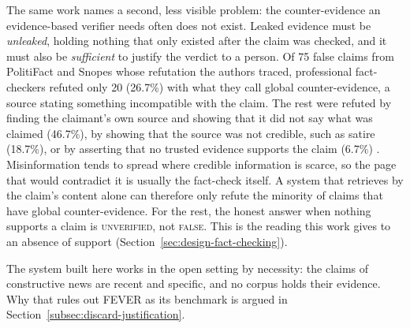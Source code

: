 The same work names a second, less visible problem: the counter-evidence
an evidence-based verifier needs often does not exist. Leaked evidence
must be \emph{unleaked}, holding nothing that only existed after the
claim was checked, and it must also be \emph{sufficient} to justify the
verdict to a person. Of 75 false claims from PolitiFact and Snopes whose
refutation the authors traced, professional fact-checkers refuted only
20 (26.7\%) with what they call global counter-evidence, a source stating
something incompatible with the claim. The rest were refuted by finding the
claimant's own source and showing that it did not say what was claimed
(46.7\%), by showing that the source was not credible, such as satire
(18.7\%), or by asserting that no trusted evidence supports the claim
(6.7\%) \cite{glockner2022missing}. Misinformation tends to spread where
credible information is scarce, so the page that would contradict it is
usually the fact-check itself. A system that retrieves by the claim's
content alone can therefore only refute the minority of claims that
have global counter-evidence. For the rest, the honest answer when
nothing supports a claim is \textsc{unverified}, not \textsc{false}.
This is the reading this work gives to an absence of support
(Section~\ref{sec:design-fact-checking}).

The system built here works in the open setting by necessity: the
claims of constructive news are recent and specific, and no corpus
holds their evidence. Why that rules out FEVER as its benchmark is
argued in Section~\ref{subsec:discard-justification}.
